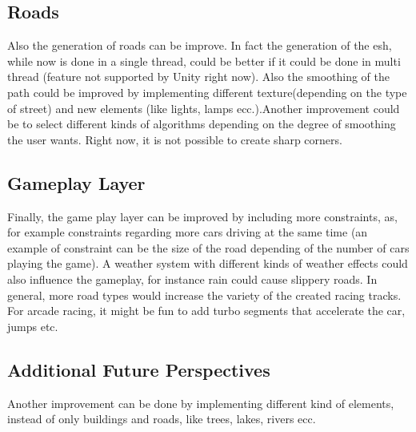 \documentclass[conference]{IEEEtran}
\begin{document}
\subsection{Roads}

Also the generation of roads can be improve. In fact the generation of the esh, while now is done in a single thread, could be better if it could be done in multi thread (feature not supported by Unity right now). Also the smoothing of the path could be improved by implementing different texture(depending on the type of street) and new elements (like lights, lamps ecc.).Another improvement could be to select different kinds of algorithms depending on the degree of smoothing the user wants. Right now, it is not possible to create sharp corners.

\subsection{Gameplay Layer}

Finally, the game play layer can be improved by including more constraints, as, for example constraints regarding more cars driving at the same time (an example of constraint can be the size of the road depending of the number of cars playing the game). A weather system with different kinds of weather effects could also influence the gameplay, for instance rain could cause slippery roads. In general, more road types would increase the variety of the created racing tracks. For arcade racing, it might be fun to add turbo segments that accelerate the car, jumps etc.

\subsection{Additional Future Perspectives}
Another improvement can be done by implementing different kind of elements, instead of only buildings and roads, like trees, lakes, rivers ecc.
\end{document}
